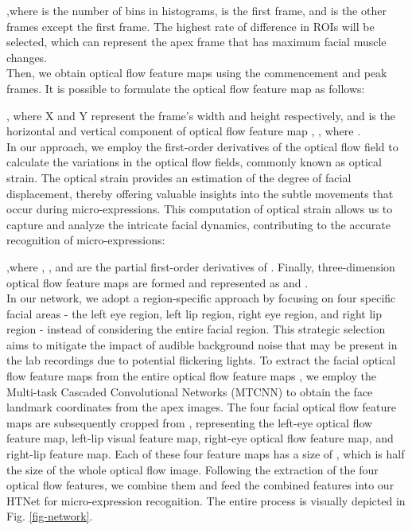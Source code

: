 \documentclass[review,12pt, 3p]{elsarticle}
\begin{document}
,where  is the number of bins in histograms,  is the first frame, and  is the other frames except the first frame. The highest rate of difference in ROIs will be selected, which can represent the apex frame that has maximum facial muscle changes. \\
Then, we obtain optical flow feature maps using the commencement and peak frames. It is possible to formulate the optical flow feature map as follows:

, where X and Y represent the frame's width  and height  respectively,  and    is the horizontal  and  vertical component of optical flow feature map , , where .\\
In our approach, we employ the first-order derivatives of the optical flow field to calculate the variations in the optical flow fields, commonly known as optical strain. The optical strain provides an estimation of the degree of facial displacement, thereby offering valuable insights into the subtle movements that occur during micro-expressions. This computation of optical strain allows us to capture and analyze the intricate facial dynamics, contributing to the accurate recognition of micro-expressions:

,where , ,  and  are the  partial first-order derivatives of . Finally, three-dimension optical flow feature maps are formed and represented as  and  . \\
In our network, we adopt a region-specific approach by focusing on four specific facial areas - the left eye region, left lip region, right eye region, and right lip region - instead of considering the entire facial region. This strategic selection aims to mitigate the impact of audible background noise that may be present in the lab recordings due to potential flickering lights. To extract the facial optical flow feature maps from the entire optical flow feature maps , we employ the Multi-task Cascaded Convolutional Networks (MTCNN) \cite{ref-42} to obtain the face landmark coordinates from the apex images. The four facial optical flow feature maps are subsequently cropped from , representing the left-eye optical flow feature map, left-lip visual feature map, right-eye optical flow feature map, and right-lip feature map. Each of these four feature maps has a size of , which is half the size of the whole optical flow image. Following the extraction of the four optical flow features, we combine them and feed the combined features into our HTNet for micro-expression recognition. The entire process is visually depicted in Fig. \ref{fig-network}.\\
\end{document}
